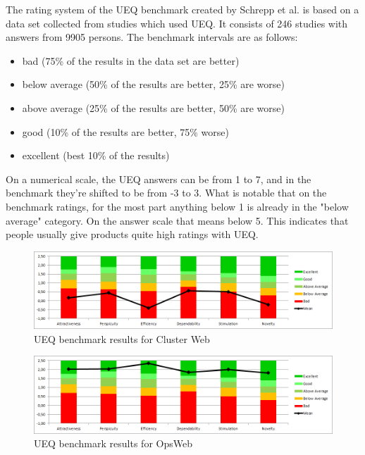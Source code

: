 The rating system of the UEQ benchmark created by Schrepp et al. is based on a data set collected from studies which used UEQ. It consists of 246 studies with answers from 9905 persons. The benchmark intervals are as follows:
\begin{itemize}
    \item bad (75\% of the results in the data set are better)
    \item below average (50\% of the results are better, 25\% are worse)
    \item above average (25\% of the results are better, 50\% are worse)
    \item good (10\% of the results are better, 75\% worse)
    \item excellent (best 10\% of the results)
\end{itemize}\cite{schrepp2017construction}

On a numerical scale, the UEQ answers can be from 1 to 7, and in the benchmark they're shifted to be from -3 to 3. What is notable that on the benchmark ratings, for the most part anything below 1 is already in the "below average" category. On the answer scale that means below 5. This indicates that people usually give products quite high ratings with UEQ.

\begin{figure}[ht]
  \begin{center}
    \includegraphics*[width=1\textwidth]{cw_ueq}
  \end{center}
  \caption{UEQ benchmark results for Cluster Web}
  \label{fig:cw_ueq}
\end{figure}

\begin{figure}[ht]
  \begin{center}
    \includegraphics*[width=1\textwidth]{ow_ueq}
  \end{center}
  \caption{UEQ benchmark results for OpsWeb}
  \label{fig:ow_ueq}
\end{figure}


